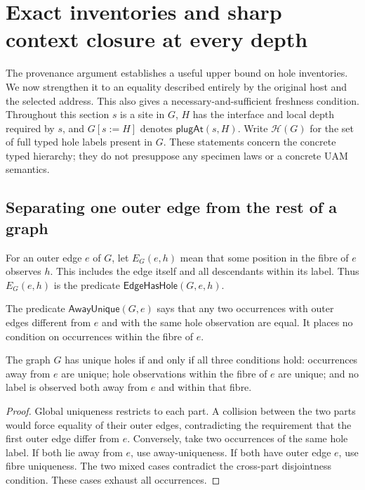 \section{Exact inventories and sharp context closure at every depth}
\label{sec:deep-inventory}

The provenance argument establishes a useful upper bound on hole inventories.
We now strengthen it to an equality described entirely by the original host and
the selected address. This also gives a necessary-and-sufficient freshness
condition. Throughout this section $s$ is a site in $G$, $H$ has the interface
and local depth required by $s$, and $G[s:=H]$ denotes $\mathsf{plugAt}(s,H)$.
Write $\mathcal H(G)$ for the set of full typed hole labels present in $G$.
These statements concern the concrete typed hierarchy; they do not presuppose
any specimen laws or a concrete UAM semantics.

\subsection{Separating one outer edge from the rest of a graph}

\begin{definition}\label{term:edge-hole-inventory}
For an outer edge $e$ of $G$, let $E_G(e,h)$ mean that some position in the fibre
of $e$ observes $h$. This includes the edge itself and all descendants within
its label. Thus $E_G(e,h)$ is the predicate $\mathsf{EdgeHasHole}(G,e,h)$.
\end{definition}

\begin{definition}\label{term:away-unique}
The predicate $\mathsf{AwayUnique}(G,e)$ says that any two occurrences with outer
edges different from $e$ and with the same hole observation are equal. It places
no condition on occurrences within the fibre of $e$.
\end{definition}

\begin{lemma}
The graph $G$ has unique holes if and only if all three conditions hold:
occurrences away from $e$ are unique; hole observations within the fibre of $e$
are unique; and no label is observed both away from $e$ and within that fibre.
\end{lemma}
\begin{proof}
Global uniqueness restricts to each part. A collision between the two parts
would force equality of their outer edges, contradicting the requirement that
the first outer edge differ from $e$. Conversely, take two occurrences of the
same hole label. If both lie away from $e$, use away-uniqueness. If both have
outer edge $e$, use fibre uniqueness. The two mixed cases contradict the
cross-part disjointness condition. These cases exhaust all occurrences.
\end{proof}

